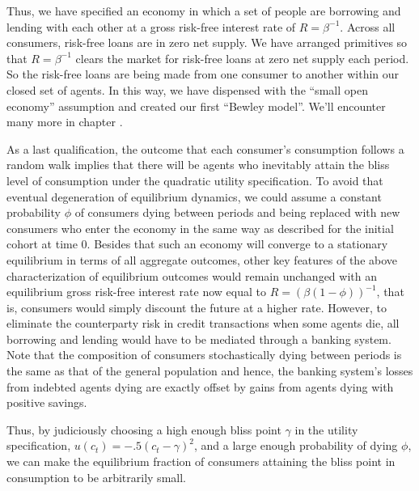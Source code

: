 Thus, we have specified  an economy in which a  set of people are borrowing and lending
with each other at a gross risk-free interest rate of
$R = \beta^{-1}$.
Across all consumers, risk-free loans are in zero net supply.
We have arranged primitives so that $R = \beta^{-1}$ clears the market for risk-free loans at zero net supply each period. 
So the risk-free loans are being made from one consumer to another within our closed set of agents.
In this way, we have dispensed with the ``small open economy'' assumption and created our 
first ``Bewley model''.  We'll encounter many more in chapter .


As a last qualification, the outcome that each consumer's
consumption follows a random walk implies that there will
be agents who inevitably attain the bliss
level of consumption under the quadratic utility
specification.
To avoid that eventual degeneration of equilibrium 
dynamics, we could assume a constant probability $\phi$ of 
consumers dying between periods and being replaced with 
new consumers who enter the economy in the same way
as described for the initial 
cohort at time $0$. Besides that such an economy will 
converge to a stationary equilibrium in terms of all
aggregate outcomes, other key features of the above
characterization of equilibrium outcomes would remain
unchanged with an equilibrium gross  risk-free interest 
rate now equal to $R = (\beta (1-\phi))^{-1}$, that is, 
consumers would simply discount the future at a higher 
rate. However, to eliminate the counterparty risk in 
credit transactions when some agents die, all borrowing 
and lending would
have to be mediated through a banking system. Note
that the composition of consumers stochastically dying 
between periods is the same as that of the general population
and hence, the banking system's losses from indebted 
agents dying are exactly offset by gains from agents 
dying with positive savings. 

Thus, by judiciously choosing a high enough bliss
point $\gamma$ in the utility specification, 
$u(c_t) =  -.5 (c_t - \gamma)^2$, and a large enough 
probability of dying $\phi$, we can make the 
equilibrium fraction of consumers attaining the 
bliss point in consumption to be arbitrarily small.



